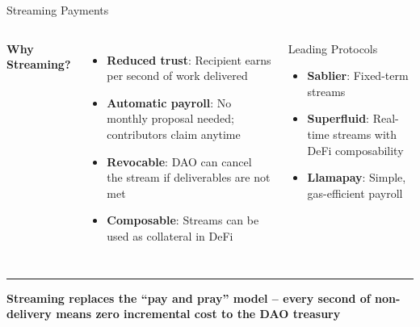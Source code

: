 \documentclass[8pt,aspectratio=169]{beamer}
\newcommand{\bottomnote}[1]{\vfill\vspace{-2mm}\textcolor{mllavender2}{\rule{\textwidth}{0.4pt}}\vspace{1mm}\footnotesize\textbf{#1}}
\begin{document}
\begin{frame}{Streaming Payments}
\begin{columns}[T]
\vspace{2mm}
\textbf{\textcolor{mlpurple}{Why Streaming?}}\\[4pt]
\begin{itemize}\setlength\itemsep{4pt}
  \item \textbf{Reduced trust}: Recipient earns per second of work delivered
  \item \textbf{Automatic payroll}: No monthly proposal needed; contributors claim anytime
  \item \textbf{Revocable}: DAO can cancel the stream if deliverables are not met
  \item \textbf{Composable}: Streams can be used as collateral in DeFi
\end{itemize}
\vspace{4pt}
\begin{block}{Leading Protocols}
\begin{itemize}\setlength\itemsep{2pt}
  \item \textbf{Sablier}: Fixed-term streams
  \item \textbf{Superfluid}: Real-time streams with DeFi composability
  \item \textbf{Llamapay}: Simple, gas-efficient payroll
\end{itemize}
\end{block}
\end{columns}
\bottomnote{Streaming replaces the ``pay and pray'' model -- every second of non-delivery means zero incremental cost to the DAO treasury}
\end{frame}
\end{document}
